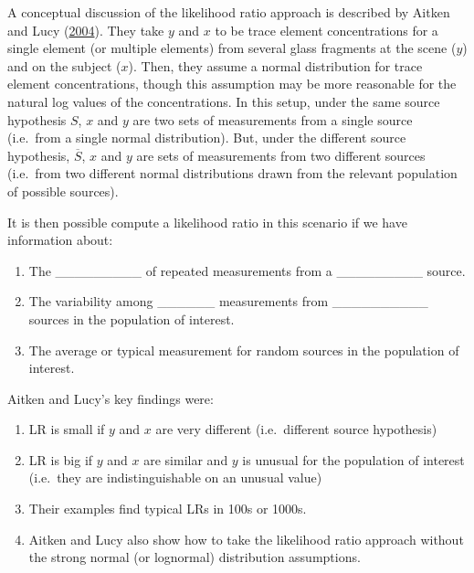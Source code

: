 \documentclass[]{book}
\providecommand{\tightlist}{%
  \setlength{\itemsep}{0pt}\setlength{\parskip}{0pt}}
\theoremstyle{definition}
\theoremstyle{definition}
\theoremstyle{remark}
\begin{document}
A conceptual discussion of the likelihood ratio approach is described by
Aitken and Lucy (\protect\hyperlink{ref-aitkenlucy}{2004}). They take
\(y\) and \(x\) to be trace element concentrations for a single element
(or multiple elements) from several glass fragments at the scene (\(y\))
and on the subject (\(x\)). Then, they assume a normal distribution for
trace element concentrations, though this assumption may be more
reasonable for the natural log values of the concentrations. In this
setup, under the same source hypothesis \(S\), \(x\) and \(y\) are two
sets of measurements from a single source (i.e.~from a single normal
distribution). But, under the different source hypothesis,
\(\overline{S}\), \(x\) and \(y\) are sets of measurements from two
different sources (i.e.~from two different normal distributions drawn
from the relevant population of possible sources).

It is then possible compute a likelihood ratio in this scenario if we
have information about:

\begin{enumerate}
\def\labelenumi{\arabic{enumi}.}
\tightlist
\item
  The \_\_\_\_\_\_\_\_\_ of repeated measurements from a
  \_\_\_\_\_\_\_\_\_ source. \vspace{.1in}
\item
  The variability among \_\_\_\_\_\_ measurements from
  \_\_\_\_\_\_\_\_\_\_ sources in the population of
  interest.\vspace{.1in}
\item
  The average or typical measurement for random sources in the
  population of interest.
\end{enumerate}

Aitken and Lucy's key findings were:

\begin{enumerate}
\def\labelenumi{\arabic{enumi}.}
\tightlist
\item
  LR is small if \(y\) and \(x\) are very different (i.e.~different
  source hypothesis)
\item
  LR is big if \(y\) and \(x\) are similar and \(y\) is unusual for the
  population of interest (i.e.~they are indistinguishable on an unusual
  value)
\item
  Their examples find typical LRs in 100s or 1000s.
\item
  Aitken and Lucy also show how to take the likelihood ratio approach
  without the strong normal (or lognormal) distribution assumptions.
\end{enumerate}
\end{document}
